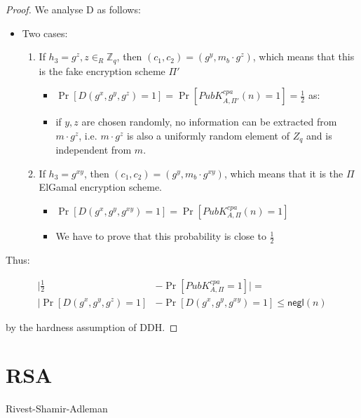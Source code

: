 \documentclass[11pt]{article}
\theoremstyle{definition}
\theoremstyle{proof}
\newcommand{\negl}{\mathsf{negl}}
\begin{document}
\begin{proof}
	We analyse D as follows:
	\begin{itemize}
		\item Two cases:
		\begin{enumerate}
			\item If $h_3 = g^z, z \in_R \mathbb{Z}_q$, then $(c_1, c_2) = (g^y, m_b \cdot g^z)$, which means that this is the fake encryption scheme $\Pi'$
			\begin{itemize}
				\item $\Pr[D(g^x, g^y, g^z) = 1] = \Pr[PubK^{cpa}_{A,\Pi'}(n) = 1] = \frac{1}{2}$ as:
				\item if $y, z$ are chosen randomly, no information can be extracted from $m \cdot g^z$, i.e. $m \cdot g^z$ is also a uniformly random element of $\textit{Z}_q$ and is independent from $m$.
			\end{itemize}
			\item If $h_3 = g^{xy}$, then $(c_1, c_2) = (g^y, m_b \cdot g^{xy})$, which means that it is the $\Pi$ ElGamal encryption scheme.
			\begin{itemize}
				\item $\Pr[D(g^x, g^y, g^{xy}) = 1] = \Pr[PubK_{A, \Pi}^{cpa}(n) = 1]$
				\item We have to prove that this probability is close to $\frac{1}{2}$
			\end{itemize}
		\end{enumerate}
	\end{itemize}
	
	Thus:
	
	\begin{align}
		|\frac{1}{2} &- \Pr[PubK^{cpa}_{A, \Pi} = 1]| = \\
		|\Pr[D(g^x, g^y, g^z) = 1] &- \Pr[D(g^x, g^y, g^{xy}) = 1] \le \negl(n)
	\end{align}
	
	by the hardness assumption of DDH.
	
\end{proof}

\section{RSA}

Rivest-Shamir-Adleman
\end{document}
